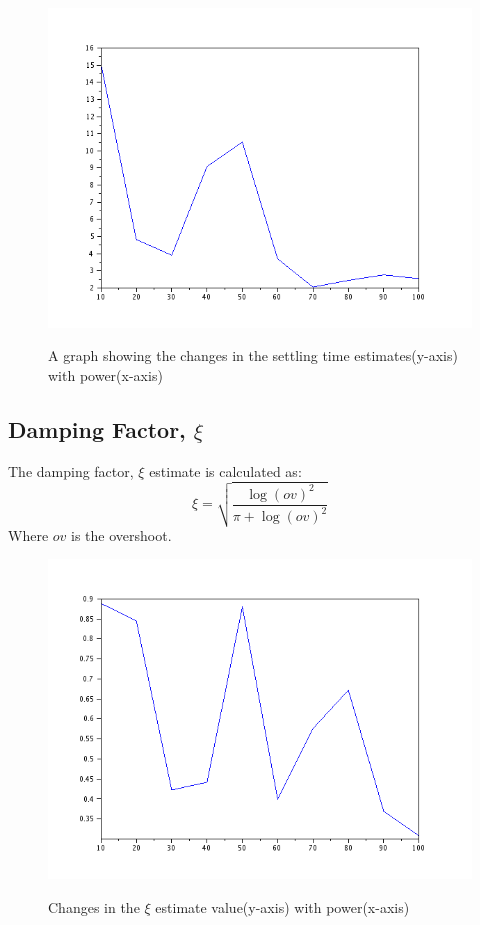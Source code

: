 \begin{figure}[H]
\centering
	\includegraphics[scale=0.5]{images/_power_vs_st.png} \\
    \caption{A graph showing the changes in the settling time estimates(y-axis) with power(x-axis)}
\end{figure}

\subsection{Damping Factor, $\xi$}
\label{sec:dampingFactor}
The damping factor, $\xi$ estimate is calculated as:
\begin{equation}
 \xi = \sqrt{\frac {\log (ov)^2}{\pi + \log (ov)^2}}
\end{equation}
Where  $ov$ is the overshoot.


\begin{figure}[H]
\centering
	\includegraphics[scale=0.5]{images/_power_vs_xi.png} \\
    \caption{Changes in the $\xi$ estimate value(y-axis) with power(x-axis)}
\end{figure}

